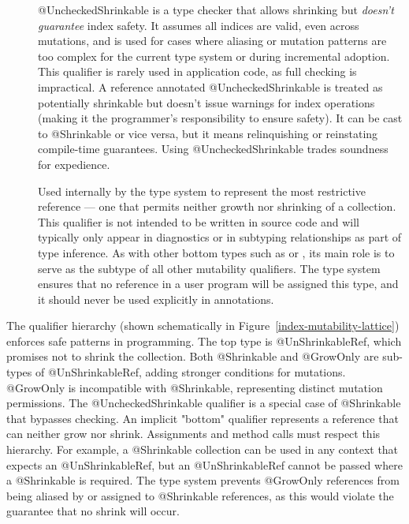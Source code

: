 \begin{description}
\item[]
  @UncheckedShrinkable is a type checker that allows shrinking but \emph{doesn't guarantee} index safety.
  It assumes all indices are valid, even across mutations, and is used for cases where aliasing or
  mutation patterns are too complex for the current type system or during incremental adoption.
  This qualifier is rarely used in application code, as full checking is impractical. A reference
  annotated @UncheckedShrinkable is treated as potentially shrinkable but doesn't issue warnings for
  index operations (making it the programmer’s responsibility to ensure safety). It can be cast to
  @Shrinkable or vice versa, but it means relinquishing or reinstating compile-time guarantees.
  Using @UncheckedShrinkable trades soundness for expedience.

\item[]
  Used internally by the type system to represent the most restrictive reference — one that
  permits neither growth nor shrinking of a collection. This qualifier is not intended
  to be written in source code and will typically only appear in diagnostics or in
  subtyping relationships as part of type inference. As with other bottom types such as
   or
  , its main role is to serve as
  the subtype of all other mutability qualifiers. The type system ensures that no
  reference in a user program will be assigned this type, and it should never be used
  explicitly in annotations.
\end{description}

The qualifier hierarchy (shown schematically in Figure~\ref{index-mutability-lattice}) enforces
safe patterns in programming. The top type is @UnShrinkableRef, which promises not to shrink the
collection. Both @Shrinkable and @GrowOnly are sub-types of @UnShrinkableRef, adding stronger
conditions for mutations. @GrowOnly is incompatible with @Shrinkable, representing distinct
mutation permissions. The @UncheckedShrinkable qualifier is a special case of @Shrinkable that
bypasses checking. An implicit "bottom" qualifier represents a reference that can neither grow nor
shrink. Assignments and method calls must respect this hierarchy. For example, a @Shrinkable collection
can be used in any context that expects an @UnShrinkableRef, but an @UnShrinkableRef cannot be passed
where a @Shrinkable is required. The type system prevents @GrowOnly references from being aliased by or
assigned to @Shrinkable references, as this would violate the guarantee that no shrink will occur.

